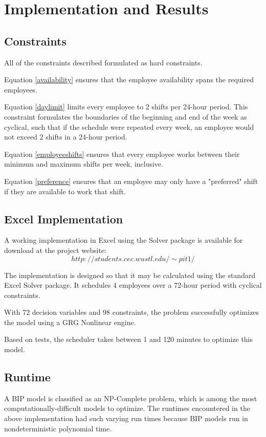 \chapter{Implementation and Results}


\section{Constraints}
All of the constraints described formulated as hard constraints. 

Equation \eqref{availability} ensures that the employee availability spans the required employees.

Equation \eqref{daylimit} limits every employee to 2 shifts per 24-hour period. This constraint formulates the boundaries of the beginning and end of the week as cyclical, such that if the schedule were repeated every week, an employee would not exceed 2 shifts in a 24-hour period. 

Equation \eqref{employeeshifts} ensures that every employee works between their minimum and maximum shifts per week, inclusive.

Equation \eqref{preference} ensures that an employee may only have a "preferred" shift if they are available to work that shift. 

\section{Excel Implementation}
A working implementation in Excel using the Solver package is available for download at the project website:
$$http://students.cec.wustl.edu/\sim pit1/$$

The implementation is designed so that it may be calculated using the standard Excel Solver package. It schedules 4 employees over a 72-hour period with cyclical constraints. 

With 72 decision variables and 98 constraints, the problem successfully optimizes the model using a GRG Nonlinear engine. 

Based on tests, the scheduler takes between 1 and 120 minutes to optimize this model. 

\section{Runtime}

A BIP model is classified as an NP-Complete problem, which is among the most computationally-difficult models to optimize. The runtimes encountered in the above implementation had such varying run times because BIP models run in nondeterministic polynomial time. 


